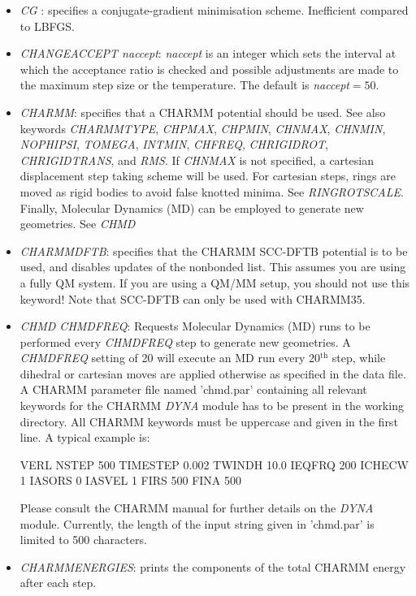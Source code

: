 \documentclass[12pt,a4paper,dvips]{article}
\begin{document}
\begin{itemize}
\item {\it CG \/}: specifies a conjugate-gradient minimisation scheme. Inefficient compared to LBFGS.

\item {\it CHANGEACCEPT naccept\/}: {\it naccept\/} is an integer which sets the interval
at which the acceptance ratio is checked and possible adjustments are made to the maximum
step size or the temperature. The default is {\it naccept\/}$=50$.
  
\item {\it CHARMM}: specifies that a CHARMM potential should be used.
See also keywords {\it CHARMMTYPE}, {\it CHPMAX}, {\it CHPMIN}, {\it CHNMAX}, {\it CHNMIN},
{\it NOPHIPSI}, {\it TOMEGA}, {\it INTMIN}, {\it CHFREQ}, {\it CHRIGIDROT}, 
{\it CHRIGIDTRANS}, and {\it RMS}. If {\it CHNMAX} is not specified, a cartesian 
displacement step taking scheme will be used. For cartesian steps, rings are moved as rigid bodies to avoid false knotted minima. See {\it RINGROTSCALE}. Finally, Molecular Dynamics (MD) can be employed to generate new geometries. See {\it CHMD} 

\item {\it CHARMMDFTB\/}: specifies that the CHARMM SCC-DFTB potential is to be used, and 
disables updates of the nonbonded list. This assumes you are using a fully QM system. If you
are using a QM/MM setup, you should not use this keyword! Note that SCC-DFTB can only be used 
with CHARMM35.  

\item {\it CHMD CHMDFREQ\/}: Requests Molecular Dynamics (MD) runs to be performed every {\it CHMDFREQ} step to generate new geometries. A {\it CHMDFREQ} setting of 20 will execute an MD run every 20$^\mathrm{th}$ step, while dihedral or cartesian moves are applied otherwise as specified in the data file. A CHARMM parameter file named 'chmd.par' containing all relevant keywords for the CHARMM {\it DYNA} module has to be present in the working directory. All CHARMM keywords must be uppercase and given in the first line. A typical example is:

VERL NSTEP 500 TIMESTEP 0.002 TWINDH 10.0 IEQFRQ 200 ICHECW 1 IASORS 0 IASVEL 1 FIRS 500 FINA 500 

Please consult the CHARMM manual for further details on the {\it DYNA} module. Currently, the length of the input string given in 'chmd.par' is limited to 500 characters.

\item{\it CHARMMENERGIES}: prints the components of the total CHARMM energy after each step.


\end{itemize}
\end{document}
